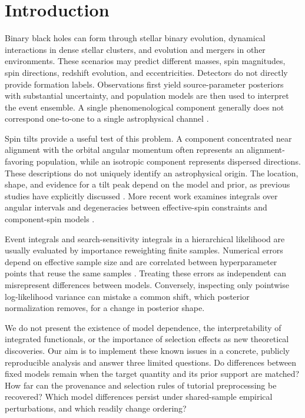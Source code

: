 \documentclass[a4paper,11pt]{article}
\begin{document}
\section{Introduction}\label{sec:1}
Binary black holes can form through stellar binary evolution, dynamical interactions in dense stellar clusters, and evolution and mergers in other environments. These scenarios may predict different masses, spin magnitudes, spin directions, redshift evolution, and eccentricities. Detectors do not directly provide formation labels. Observations first yield source-parameter posteriors with substantial uncertainty, and population models are then used to interpret the event ensemble. A single phenomenological component generally does not correspond one-to-one to a single astrophysical channel \cite{ref1}.

Spin tilts provide a useful test of this problem. A component concentrated near alignment with the orbital angular momentum often represents an alignment-favoring population, while an isotropic component represents dispersed directions. These descriptions do not uniquely identify an astrophysical origin. The location, shape, and evidence for a tilt peak depend on the model and prior, as previous studies have explicitly discussed \cite{ref2}. More recent work examines integrals over angular intervals and degeneracies between effective-spin constraints and component-spin models \cite{ref5,ref6}.

Event integrals and search-sensitivity integrals in a hierarchical likelihood are usually evaluated by importance reweighting finite samples. Numerical errors depend on effective sample size and are correlated between hyperparameter points that reuse the same samples \cite{ref3,ref4}. Treating these errors as independent can misrepresent differences between models. Conversely, inspecting only pointwise log-likelihood variance can mistake a common shift, which posterior normalization removes, for a change in posterior shape.

We do not present the existence of model dependence, the interpretability of integrated functionals, or the importance of selection effects as new theoretical discoveries. Our aim is to implement these known issues in a concrete, publicly reproducible analysis and answer three limited questions. Do differences between fixed models remain when the target quantity and its prior support are matched? How far can the provenance and selection rules of tutorial preprocessing be recovered? Which model differences persist under shared-sample empirical perturbations, and which readily change ordering?
\end{document}
